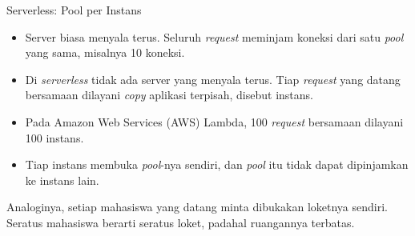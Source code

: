 \documentclass[aspectratio=169, table, 12pt]{beamer}
\begin{document}
\begin{frame}{{\Large Serverless: Pool per Instans}}
  \vspace{8pt}
  \begin{itemize}
    \item Server biasa menyala terus. Seluruh \textit{request} meminjam
          koneksi dari satu \textit{pool} yang sama, misalnya 10 koneksi.
    \item Di \textit{serverless} tidak ada server yang menyala terus.
          Tiap \textit{request} yang datang bersamaan dilayani \textit{copy}
          aplikasi terpisah, disebut instans.
    \item Pada Amazon Web Services (AWS) Lambda, 100 \textit{request}
          bersamaan dilayani 100 instans.
    \item Tiap instans membuka \textit{pool}-nya sendiri, dan \textit{pool}
          itu tidak dapat dipinjamkan ke instans lain.
  \end{itemize}
  \vspace{6pt}
  {\footnotesize Analoginya, setiap mahasiswa yang datang minta dibukakan
  loketnya sendiri. Seratus mahasiswa berarti seratus loket, padahal
  ruangannya terbatas.}
\end{frame}
\end{document}
